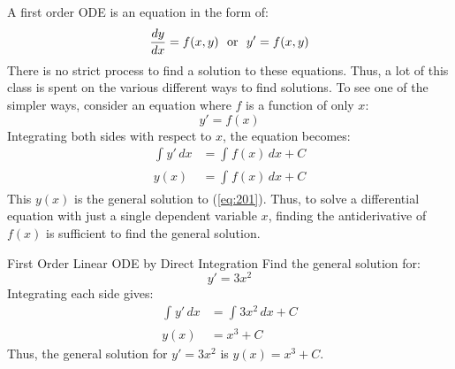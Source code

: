 \documentclass[12pt]{article}
\begin{document}
A first order ODE is an equation in the form of:
\begin{equation}
  \frac{dy}{dx} = f(x,y) \ \ \textup{or} \ \ y' = f(x,y)
  \label{eq:201}
\end{equation}
There is no strict process to find a solution to these equations. Thus, a lot of this class is spent on the various different ways to find solutions. To see one of the simpler ways, consider an equation where $f$ is a function of only $x$:
\begin{equation*}
  y' = f(x)
\end{equation*}
Integrating both sides with respect to $x$, the equation becomes:
\begin{align*}
  \int_{}^{} y' \, dx &= \int_{}^{} f(x) \, dx + C \\
  y(x) &= \int_{}^{} f(x) \, dx + C
\end{align*}
This $y(x)$ is the general solution to (\ref{eq:201}). Thus, to solve a differential equation with just a single dependent variable $x$, finding the antiderivative of $f(x)$ is sufficient to find the general solution.
\begin{example}{First Order Linear ODE by Direct Integration}
  Find the general solution for:
  \begin{equation*}
    y' = 3x^2
  \end{equation*}
  Integrating each side gives:
  \begin{align*}
    \int_{}^{} y' \, dx &= \int_{}^{} 3x^2 \, dx + C \\
    y(x) &= x^3 + C
  \end{align*}
  Thus, the general solution for $y' = 3x^2$ is $y(x) = x^3 + C$.
\end{example}
\end{document}
